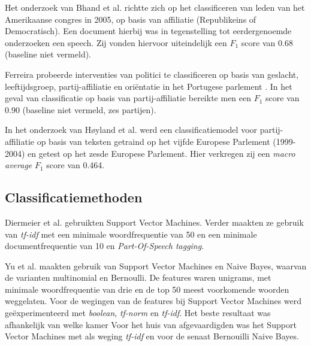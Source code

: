 Het onderzoek van Bhand et al. richtte zich op het classificeren van leden van het Amerikaanse congres in 2005, op basis van affiliatie (Republikeins of Democratisch)\cite{bhand}. Een document hierbij was in tegenstelling tot eerdergenoemde onderzoeken een speech. Zij vonden hiervoor uiteindelijk een $F_1$ score van 0.68 (baseline niet vermeld).\par

Ferreira probeerde interventies van politici te classificeren op basis van geslacht, leeftijdsgroep, partij-affiliatie en ori\"{e}ntatie in het Portugese parlement \cite{Ferreira2016UsingTT}. In het geval van classificatie op basis van partij-affiliatie bereikte men een $F_1$ score van 0.90 (baseline niet vermeld, zes partijen).\par

In het onderzoek van Høyland et al. werd een classificatiemodel voor partij-affiliatie op basis van teksten getraind op het vijfde Europese Parlement (1999-2004) en getest op het zesde Europese Parlement\cite{W14-2516}. Hier verkregen zij een \textit{macro average} $F_1$ score van 0.464.\par

\subsection{Classificatiemethoden}
\label{sec:Deelvraag1}
Diermeier et al. \cite{diermeier_godbout_yu_kaufmann_2012} gebruikten Support Vector Machines. Verder maakten ze gebruik van \textit{tf-idf} met een minimale woordfrequentie van 50 en een minimale documentfrequentie van 10 en \textit{Part-Of-Speech tagging}.\par
Yu et al. \cite{doi:10.1080/19331680802149608} maakten gebruik van Support Vector Machines en Naive Bayes, waarvan de varianten multinomial en Bernoulli. De features waren unigrams, met minimale woordfrequentie van drie en de top 50 meest voorkomende woorden weggelaten. Voor de wegingen van de features bij Support Vector Machines werd geëxperimenteerd met \textit{boolean}, \textit{tf-norm} en \textit{tf-idf}. Het beste resultaat was afhankelijk van welke kamer Voor het huis van afgevaardigden was het Support Vector Machines met als weging \textit{tf-idf} en voor de senaat Bernouilli Naive Bayes.

